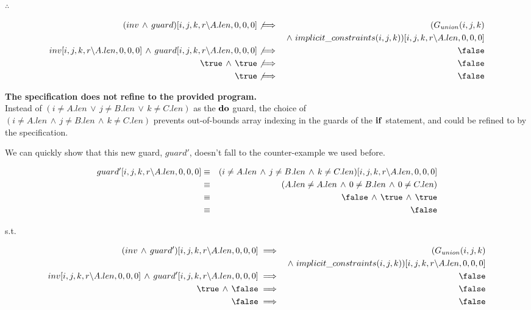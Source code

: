 \documentclass[a4paper]{article}
\newcommand{\DOGUARD}[3]{({#1} \neq A.len\, \lor\, {#2} \neq B.len\, \lor\, {#3} \neq C.len)}
\newcommand{\SUBSTITUTION}{[i, j, k, r \backslash A.len, 0, 0, 0]}
\begin{document}
$\therefore$

\begin{eqnarray*}
(inv\, \land\, guard)\SUBSTITUTION &\not\implies& (G_{union}(i, j, k)\\
&& \land~ implicit\_constraints(i, j, k))\SUBSTITUTION\\
inv\SUBSTITUTION\, \land\, guard\SUBSTITUTION &\not\implies& \false\\
\true\, \land\, \true &\not\implies& \false\\
\true &\not\implies& \false\\
\end{eqnarray*}

\textbf{The specification does not refine to the provided program.}\\

Instead of $\DOGUARD{i}{j}{k}$ as the ${\bf do}$ guard, the choice of\\ $(i \neq A.len\, \land\, j \neq B.len\, \land\, k \neq C.len)$ prevents out-of-bounds array indexing in the guards of the ${\bf if}$ statement, and could be refined to by the specification. 

We can quickly show that this new guard, $guard'$, doesn't fall to the counter-example we used before.

\begin{eqnarray*}
guard'\SUBSTITUTION & \equiv & (i \neq A.len\, \land\, j \neq B.len\, \land\, k \neq C.len)\SUBSTITUTION\\
    & \equiv & (A.len \neq A.len\, \land\, 0 \neq B.len\, \land\, 0 \neq C.len)\\
    & \equiv & \false\, \land\, \true\, \land\, \true\\
    & \equiv & \false
\end{eqnarray*} 

s.t.

\begin{eqnarray*}
(inv\, \land\, guard')\SUBSTITUTION &\implies& (G_{union}(i, j, k)\\
&& \land~ implicit\_constraints(i, j, k))\SUBSTITUTION\\
inv\SUBSTITUTION\, \land\, guard'\SUBSTITUTION &\implies& \false\\
\true\, \land\, \false &\implies& \false\\
\false &\implies& \false
\end{eqnarray*}
\end{document}
